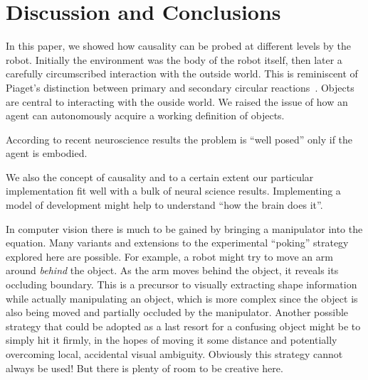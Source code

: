 
\section{Discussion and Conclusions}

In this paper, we showed how causality can be probed at different
levels by the robot.  Initially the environment was the body of the
robot itself, then later a carefully circumscribed interaction with
the outside world.  This is reminiscent of Piaget's distinction
between primary and secondary circular
reactions~\cite{ginsburg78piaget}.  Objects are central to interacting
with the ouside world.  We raised the issue of how an agent can
autonomously acquire a working definition of objects. 

\ifverbose
According to
recent neuroscience results the problem is ``well posed'' only if the
agent is embodied.
\fi

\ifverbose
We also 
the concept of causality and to a certain extent
our particular implementation fit well with a bulk of neural science
results. Implementing a model of development might help to 
understand ``how the brain does it''.
\fi


In computer vision there is much to be gained by bringing a
manipulator into the equation.  Many variants and extensions to the
experimental ``poking'' strategy explored here are possible.  For
example, a robot might try to move an arm around {\em behind} the
object.  As the arm moves behind the object, it reveals its occluding
boundary.  This is a precursor to visually extracting shape
information while actually manipulating an object, which is more
complex since the object is also being moved and partially occluded by
the manipulator.  Another possible strategy that could be adopted as a
last resort for a confusing object might be to simply hit it firmly,
in the hopes of moving it some distance and potentially overcoming
local, accidental visual ambiguity.  Obviously this strategy cannot
always be used!  But there is plenty of room to be creative here.



